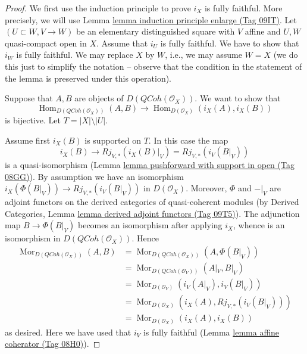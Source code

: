 \documentclass{amsart}
\theoremstyle{plain}
\theoremstyle{definition}
\theoremstyle{remark}
\numberwithin{equation}{subsection}
\def\Hom{\mathop{\mathrm{Hom}}\nolimits}
\def\Mor{\mathop{\mathrm{Mor}}\nolimits}
\def\QCoh{\mathit{QCoh}}
\begin{document}
\begin{proof}
We first use the induction principle to prove $i_X$ is fully faithful.
More precisely, we will use Lemma \href{https://stacks.math.columbia.edu/tag/09IT}{lemma induction principle enlarge (Tag 09IT)}.
Let $(U \subset W, V \to W)$ be an elementary distinguished square
with $V$ affine and $U, W$ quasi-compact open in $X$. Assume that
$i_U$ is fully faithful. We have to show that $i_W$ is fully faithful.
We may replace $X$ by $W$, i.e., we may assume $W = X$ (we do this just
to simplify the notation -- observe that the condition in the
statement of the lemma is preserved under this operation).

\medskip\noindent
Suppose that $A, B$ are objects of $D(\QCoh(\mathcal{O}_X))$.
We want to show that
$$
\Hom_{D(\QCoh(\mathcal{O}_X))}(A, B)
\longrightarrow
\Hom_{D(\mathcal{O}_X)}(i_X(A), i_X(B))
$$
is bijective. Let $T = |X| \setminus |U|$.

\medskip\noindent
Assume first $i_X(B)$ is supported on $T$. In this case the map
$$
i_X(B) \to Rj_{V, *}(i_X(B)|_V) = Rj_{V, *}(i_V(B|_V))
$$
is a quasi-isomorphism
(Lemma \href{https://stacks.math.columbia.edu/tag/08GG}{lemma pushforward with support in open (Tag 08GG)}).
By assumption we have an isomorphism
$i_X(\Phi(B|_V)) \to Rj_{V, *}(i_V(B|_V))$ in $D(\mathcal{O}_X)$.
Moreover, $\Phi$ and ${-}|_V$ are adjoint functors on the derived categories of
quasi-coherent modules (by
Derived Categories, Lemma \href{https://stacks.math.columbia.edu/tag/09T5}{lemma derived adjoint functors (Tag 09T5)}).
The adjunction map $B \to \Phi(B|_V)$ becomes an isomorphism
after applying $i_X$, whence is an isomorphism in
$D(\QCoh(\mathcal{O}_X))$.
Hence
\begin{align*}
\Mor_{D(\QCoh(\mathcal{O}_X))}(A, B)
& =
\Mor_{D(\QCoh(\mathcal{O}_X))}(A, \Phi(B|_V)) \\
& =
\Mor_{D(\QCoh(\mathcal{O}_V))}(A|_V, B|_V) \\
& =
\Mor_{D(\mathcal{O}_V)}(i_V(A|_V), i_V(B|_V)) \\
& =
\Mor_{D(\mathcal{O}_X)}(i_X(A), Rj_{V, *}(i_V(B|_V))) \\
& =
\Mor_{D(\mathcal{O}_X)}(i_X(A), i_X(B))
\end{align*}
as desired. Here we have used that $i_V$ is fully faithful
(Lemma \href{https://stacks.math.columbia.edu/tag/08H0}{lemma affine coherator (Tag 08H0)}).


\end{proof}
\end{document}
